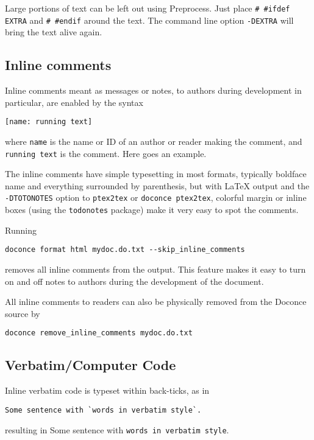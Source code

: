 \documentclass[%
oneside,                 %
final,                   %
10pt]{article}
\newcommand{\shortinlinecomment}[3]{}
\begin{document}
Large portions of text can be left out using Preprocess. Just place
\Verb!# #ifdef EXTRA! and \Verb!# #endif! around the text. The command line
option \Verb!-DEXTRA! will bring the text alive again.

\subsection{Inline comments}

Inline comments meant as messages or notes, to authors during development
in particular,
are enabled by the syntax
\begin{Verbatim}[numbers=none,fontsize=\fontsize{9pt}{9pt},baselinestretch=0.85,xleftmargin=0mm]
[name: running text]
\end{Verbatim}
where \Verb!name! is the name or ID of an author or reader making the comment,
and \Verb!running text! is the comment. Here goes an example.
\shortinlinecomment{hpl}{There must be a space after the colon,
but the running text can occupy multiple lines.}{There must be a space after the colon, but the running text}
The inline comments have simple typesetting in most formats, typically boldface
name and everything surrounded by parenthesis, but with {\LaTeX}
output and the \Verb!-DTOTONOTES! option to \Verb!ptex2tex! or \Verb!doconce ptex2tex!,
colorful margin or inline boxes (using the \Verb!todonotes! package)
make it very easy to spot the comments.

Running
\begin{Verbatim}[numbers=none,fontsize=\fontsize{9pt}{9pt},baselinestretch=0.85,xleftmargin=0mm]
doconce format html mydoc.do.txt --skip_inline_comments
\end{Verbatim}
removes all inline comments from the output. This feature makes it easy
to turn on and off notes to authors during the development of the document.

All inline comments to readers can also be physically
removed from the Doconce source by
\begin{Verbatim}[numbers=none,fontsize=\fontsize{9pt}{9pt},baselinestretch=0.85,xleftmargin=0mm]
doconce remove_inline_comments mydoc.do.txt
\end{Verbatim}

\subsection{Verbatim/Computer Code}

Inline verbatim code is typeset within back-ticks, as in
\begin{Verbatim}[numbers=none,fontsize=\fontsize{9pt}{9pt},baselinestretch=0.85,xleftmargin=0mm]
Some sentence with `words in verbatim style`.
\end{Verbatim}
resulting in Some sentence with \Verb!words in verbatim style!.
\end{document}

